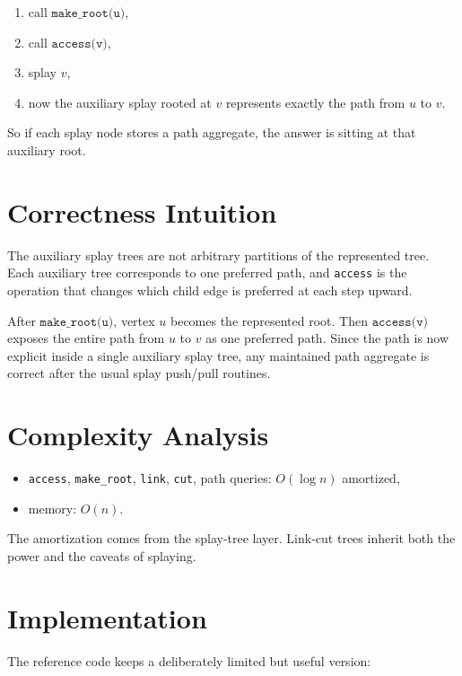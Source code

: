 \begin{enumerate}
  \item call \(\texttt{make\_root(u)}\),
  \item call \(\texttt{access(v)}\),
  \item splay \(v\),
  \item now the auxiliary splay rooted at \(v\) represents exactly the path from \(u\) to \(v\).
\end{enumerate}

So if each splay node stores a path aggregate, the answer is sitting at that auxiliary root.

\section*{Correctness Intuition}

The auxiliary splay trees are not arbitrary partitions of the represented tree. Each auxiliary tree corresponds to one
preferred path, and \texttt{access} is the operation that changes which child edge is preferred at each step upward.

After \(\texttt{make\_root(u)}\), vertex \(u\) becomes the represented root. Then \(\texttt{access(v)}\) exposes the
entire path from \(u\) to \(v\) as one preferred path. Since the path is now explicit inside a single auxiliary splay
tree, any maintained path aggregate is correct after the usual splay push/pull routines.

\section*{Complexity Analysis}

\begin{itemize}
  \item \texttt{access}, \texttt{make\_root}, \texttt{link}, \texttt{cut}, path queries: \(O(\log n)\) amortized,
  \item memory: \(O(n)\).
\end{itemize}

The amortization comes from the splay-tree layer. Link-cut trees inherit both the power and the caveats of splaying.

\section*{Implementation}

The reference code keeps a deliberately limited but useful version:

